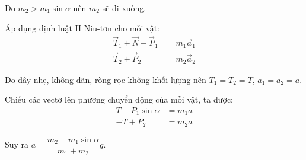 \begin{enumerate}[label=\bfseries Câu \arabic*:]
{		Do $m_2 > m_1 \sin \alpha$ nên $m_2$ sẽ đi xuống.
		
		Áp dụng định luật II Niu-tơn cho mỗi vật:
		\begin{align*}
			\vec T_1 + \vec N + \vec P_1 &= m_1 \vec a_1 \\
			\vec T_2 + \vec P_2 &= m_2 \vec a_2
		\end{align*}
		
		Do dây nhẹ, không dãn, ròng rọc không khối lượng nên $T_1 = T_2 = T$, $a_1 = a_2 = a$.
		
		Chiếu các vectơ lên phương chuyển động của mỗi vật, ta được:
		\begin{align*}
			T - P_1 \sin \alpha &= m_1 a \\
			-T + P_2 &= m_2 a
		\end{align*}
		
		Suy ra $a=\dfrac{m_2 - m_1 \sin \alpha}{m_1 + m_2}g$.
		
		
	}
\end{enumerate}

\whiteBGstarEnd

